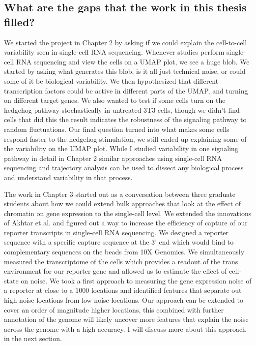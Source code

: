 \subsection{What are the gaps that the work in this thesis filled?}

We started the project in Chapter 2 by asking if we could explain the cell-to-cell variability seen in single-cell RNA sequencing. Whenever studies perform single-cell RNA sequencing and view the cells on a UMAP plot, we see a huge blob. We started by asking what generates this blob, is it all just technical noise, or could some of it be biological variability. We then hypothesized that different transcription factors could be active in different parts of the UMAP, and turning on different target genes. We also wanted to test if some cells turn on the hedgehog pathway stochastically in untreated 3T3 cells, though we didn't find cells that did this the result indicates the robustness of the signaling pathway to random fluctuations. Our final question turned into what makes some cells respond faster to the hedgehog stimulation, we still ended up explaining some of the variability on the UMAP plot. While I studied variability in one signaling pathway in detail in Chapter 2 similar approaches using single-cell RNA sequencing and trajectory analysis can be used to dissect any biological process and understand variability in that process.

The work in Chapter 3 started out as a conversation between three graduate students about how we could extend bulk approaches that look at the effect of chromatin on gene expression to the single-cell level. We extended the innovations of Akhtar et al. \cite{Akhtar} and figured out a way to increase the efficiency of capture of our reporter transcripts in single-cell RNA sequencing. We designed a reporter sequence with a specific capture sequence at the 3' end which would bind to complementary sequences on the beads from 10X Genomics. We simultaneously measured the transcriptome of the cells which provides a readout of the trans environment for our reporter gene and allowed us to estimate the effect of cell-state on noise. We took a first approach to measuring the gene expression noise of a reporter at close to a 1000 locations and identified features that separate out high noise locations from low noise locations. Our approach can be extended to cover an order of magnitude higher locations, this combined with further annotation of the genome will likely uncover more features that explain the noise across the genome with a high accuracy. I will discuss more about this approach in the next section.

